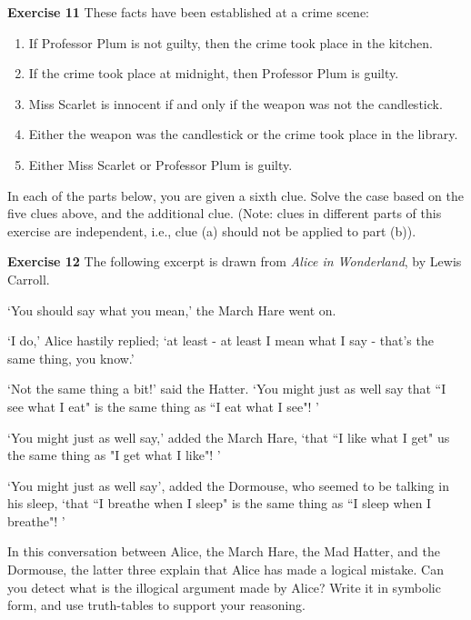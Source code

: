 \documentclass[12pt,oneside]{exam}
\newenvironment{exercise}[1]{\vspace{.1in}\noindent\textbf{Exercise #1 \hspace{.05em}}}{}
\begin{document}
\begin{exercise}{11}
These facts have been established at a crime scene:
\begin{enumerate}
\item If Professor Plum is not guilty, then the crime took place in the kitchen.
\item If the crime took place at midnight, then Professor Plum is guilty.
\item Miss Scarlet is innocent if and only if the weapon was not the candlestick.
\item Either the weapon was the candlestick or the crime took place in the library.
\item Either Miss Scarlet or Professor Plum is guilty.
\end{enumerate}

In each of the parts below, you are given a sixth clue. Solve the case based on the five clues above, and the additional clue. (Note: clues in different parts of this exercise are independent, i.e., clue (a) should not be applied to part (b)). 

\end{exercise}

\begin{exercise}{12}
The following excerpt is drawn from \textit{Alice in Wonderland}, by Lewis Carroll. 

`You should say what you mean,' the March Hare went on. 

`I do,' Alice hastily replied; `at least - at least I mean what I say - that's the same thing, you know.'

`Not the same thing a bit!' said the Hatter. `You might just as well say that ``I see what I eat" is the same thing as ``I eat what I see"! '

`You might just as well say,' added the March Hare, `that ``I like what I get" us the same thing as "I get what I like"! '

`You might just as well say', added the Dormouse, who seemed to be talking in his sleep, `that ``I breathe when I sleep" is the same thing as ``I sleep when I breathe"! '


In this conversation between Alice, the March Hare, the Mad Hatter, and the Dormouse, the latter three explain that Alice has made a logical mistake. Can you detect what is the illogical argument made by Alice? Write it in symbolic form, and use truth-tables to support your reasoning. 
\end{exercise}
\end{document}
